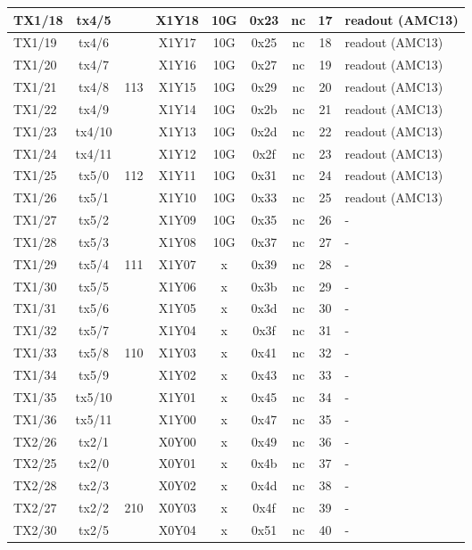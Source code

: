 \begin{longtable}{|l|c|c|c|c|c|c|c|l|}
TX1/18 & tx4/5  &     & X1Y18 & 10G & 0x23 & nc & 17 & readout (AMC13)\\\hline
TX1/19 & tx4/6  &     & X1Y17 & 10G & 0x25 & nc & 18 & readout (AMC13)\\\hline
TX1/20 & tx4/7  &     & X1Y16 & 10G & 0x27 & nc & 19 & readout (AMC13)\\\hline
TX1/21 & tx4/8  & 113 & X1Y15 & 10G & 0x29 & nc & 20 & readout (AMC13)\\\hline
TX1/22 & tx4/9  &     & X1Y14 & 10G & 0x2b & nc & 21 & readout (AMC13)\\\hline
TX1/23 & tx4/10 &     & X1Y13 & 10G & 0x2d & nc & 22 & readout (AMC13)\\\hline
TX1/24 & tx4/11 &     & X1Y12 & 10G & 0x2f & nc & 23 & readout (AMC13)\\\hline
TX1/25 & tx5/0  & 112 & X1Y11 & 10G & 0x31 & nc & 24 & readout (AMC13)\\\hline
TX1/26 & tx5/1  &     & X1Y10 & 10G & 0x33 & nc & 25 & readout (AMC13)\\\hline
TX1/27 & tx5/2  &     & X1Y09 & 10G & 0x35 & nc & 26 & -\\\hline
TX1/28 & tx5/3  &     & X1Y08 & 10G & 0x37 & nc & 27 & -\\\hline
TX1/29 & tx5/4  & 111 & X1Y07 &  x  & 0x39 & nc & 28 & -\\\hline
TX1/30 & tx5/5  &     & X1Y06 &  x  & 0x3b & nc & 29 & -\\\hline
TX1/31 & tx5/6  &     & X1Y05 &  x  & 0x3d & nc & 30 & -\\\hline
TX1/32 & tx5/7  &     & X1Y04 &  x  & 0x3f & nc & 31 & -\\\hline
TX1/33 & tx5/8  & 110 & X1Y03 &  x  & 0x41 & nc & 32 & -\\\hline
TX1/34 & tx5/9  &     & X1Y02 &  x  & 0x43 & nc & 33 & -\\\hline
TX1/35 & tx5/10 &     & X1Y01 &  x  & 0x45 & nc & 34 & -\\\hline
TX1/36 & tx5/11 &     & X1Y00 &  x  & 0x47 & nc & 35 & -\\\hline
TX2/26 & tx2/1  &     & X0Y00 &  x  & 0x49 & nc & 36 & -\\\hline
TX2/25 & tx2/0  &     & X0Y01 &  x  & 0x4b & nc & 37 & -\\\hline
TX2/28 & tx2/3  &     & X0Y02 &  x  & 0x4d & nc & 38 & -\\\hline
TX2/27 & tx2/2  & 210 & X0Y03 &  x  & 0x4f & nc & 39 & -\\\hline
TX2/30 & tx2/5  &     & X0Y04 &  x  & 0x51 & nc & 40 & -\\\hline

\end{longtable}
